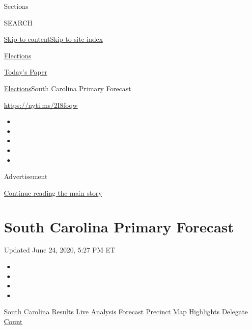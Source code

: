Sections

SEARCH

\protect\hyperlink{site-content}{Skip to
content}\protect\hyperlink{site-index}{Skip to site index}

\href{https://www.nytimes3xbfgragh.onion/news-event/2020-election}{Elections}

\href{https://myaccount.nytimes3xbfgragh.onion/auth/login?response_type=cookie\&client_id=vi}{}

\href{https://www.nytimes3xbfgragh.onion/section/todayspaper}{Today's
Paper}

\href{/news-event/2020-election}{Elections}\textbar{}South Carolina
Primary Forecast

\url{https://nyti.ms/2I8foqw}

\begin{itemize}
\item
\item
\item
\item
\item
\end{itemize}

Advertisement

\protect\hyperlink{after-top}{Continue reading the main story}

\hypertarget{south-carolina-primary-forecast}{%
\section{South Carolina Primary
Forecast}\label{south-carolina-primary-forecast}}

Updated June 24, 2020, 5:27 PM ET

\begin{itemize}
\item
\item
\item
\item
\end{itemize}

\href{https://www.nytimes3xbfgragh.onion/interactive/2020/02/29/us/elections/results-south-carolina-primary-election.html?action=click\&module=ELEX_results\&pgtype=Interactive\&region=Navigation}{South
Carolina Results}
\href{https://www.nytimes3xbfgragh.onion/interactive/2020/02/29/us/elections/results-south-carolina-live-updates.html?action=click\&module=ELEX_results\&pgtype=Interactive\&region=Navigation}{Live
Analysis}
\href{https://www.nytimes3xbfgragh.onion/interactive/2020/02/29/us/elections/results-south-carolina-live-forecast.html?action=click\&module=ELEX_results\&pgtype=Interactive\&region=Navigation}{Forecast}
\href{https://www.nytimes3xbfgragh.onion/interactive/2020/02/29/us/elections/results-south-carolina-primary-precinct-map.html?action=click\&module=ELEX_results\&pgtype=Interactive\&region=Navigation}{Precinct
Map}
\href{https://www.nytimes3xbfgragh.onion/live/2020/south-carolina-2020-democratic-primary-03-01?action=click\&module=ELEX_results\&pgtype=Interactive\&region=Navigation}{Highlights}
\href{https://www.nytimes3xbfgragh.onion/interactive/2020/us/elections/delegate-count-primary-results.html?action=click\&module=ELEX_results\&pgtype=Interactive\&region=Navigation}{Delegate
Count}

